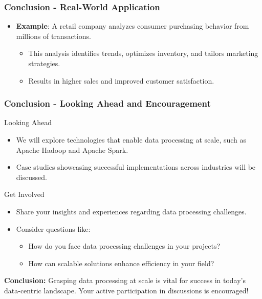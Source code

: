 \documentclass[aspectratio=169]{beamer}
\begin{document}
\begin{frame}[fragile]
    \frametitle{Conclusion - Real-World Application}
    \begin{itemize}
        \item \textbf{Example}: A retail company analyzes consumer purchasing behavior from millions of transactions.
            \begin{itemize}
                \item This analysis identifies trends, optimizes inventory, and tailors marketing strategies.
                \item Results in higher sales and improved customer satisfaction.
            \end{itemize}
    \end{itemize}
\end{frame}

\begin{frame}[fragile]
    \frametitle{Conclusion - Looking Ahead and Encouragement}
    \begin{block}{Looking Ahead}
        \begin{itemize}
            \item We will explore technologies that enable data processing at scale, such as Apache Hadoop and Apache Spark.
            \item Case studies showcasing successful implementations across industries will be discussed.
        \end{itemize}
    \end{block}

    \vspace{1em}

    \begin{block}{Get Involved}
        \begin{itemize}
            \item Share your insights and experiences regarding data processing challenges.
            \item Consider questions like:
            \begin{itemize}
                \item How do you face data processing challenges in your projects?
                \item How can scalable solutions enhance efficiency in your field?
            \end{itemize}
        \end{itemize}
    \end{block}

    \textbf{Conclusion:} Grasping data processing at scale is vital for success in today's data-centric landscape. Your active participation in discussions is encouraged!
\end{frame}
\end{document}
